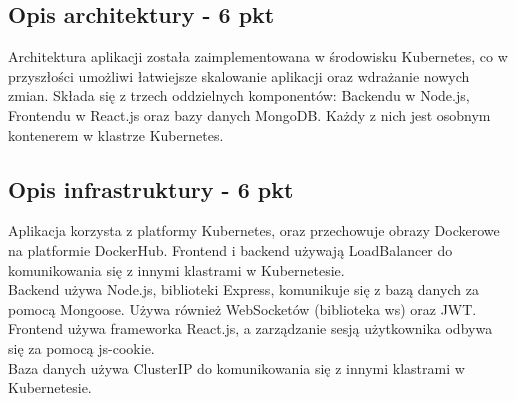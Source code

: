\documentclass[12pt,a4paper]{article}
\begin{document}
\subsection{Opis architektury - 6 pkt}
\label{sec:introduction}
Architektura aplikacji została zaimplementowana w środowisku Kubernetes, co w przyszłości umożliwi łatwiejsze skalowanie aplikacji oraz wdrażanie nowych zmian. Składa się z trzech oddzielnych komponentów: Backendu w Node.js, Frontendu w React.js oraz bazy danych MongoDB. Każdy z nich jest osobnym kontenerem w klastrze Kubernetes.

\subsection{Opis infrastruktury - 6 pkt}
\label{sec:Users}
Aplikacja korzysta z platformy Kubernetes, oraz przechowuje obrazy Dockerowe na platformie DockerHub. Frontend i backend używają LoadBalancer do komunikowania się z innymi klastrami w Kubernetesie.\\
Backend używa Node.js, biblioteki Express, komunikuje się z bazą danych za pomocą Mongoose. Używa również WebSocketów (biblioteka ws) oraz JWT.\\
Frontend używa frameworka React.js, a zarządzanie sesją użytkownika odbywa się za pomocą js-cookie.\\
Baza danych używa ClusterIP do komunikowania się z innymi klastrami w Kubernetesie.
\end{document}
